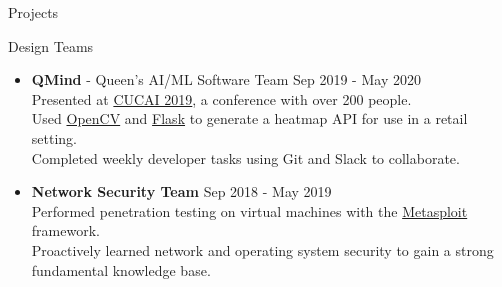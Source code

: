 \documentclass{resume} %
\begin{document}
\begin{rSection}{Projects}
\begin{rSection}{Design Teams}
\begin{itemize}
    \item {\bf QMind} - Queen's AI/ML Software Team \hfill {Sep 2019 - May 2020}\\
    Presented at \href{https://medium.com/qmind-ai/cucai2019-c9d5f848f5c}{CUCAI 2019}, a conference with over 200 people.\\
    Used \href{https://opencv.org/}{OpenCV} and \href{https://flask.palletsprojects.com/en/2.2.x/}{Flask} to generate a heatmap API for use in a retail setting.\\
    Completed weekly developer tasks using Git and Slack to collaborate.
    \item {\bf Network Security Team} \hfill {Sep 2018 - May 2019}\\
    Performed penetration testing on virtual machines with the \href{https://www.metasploit.com/}{Metasploit} framework.\\
    Proactively learned network and operating system security to gain a strong fundamental knowledge base.
\end{itemize}
\end{rSection}

\end{rSection}
\end{document}
